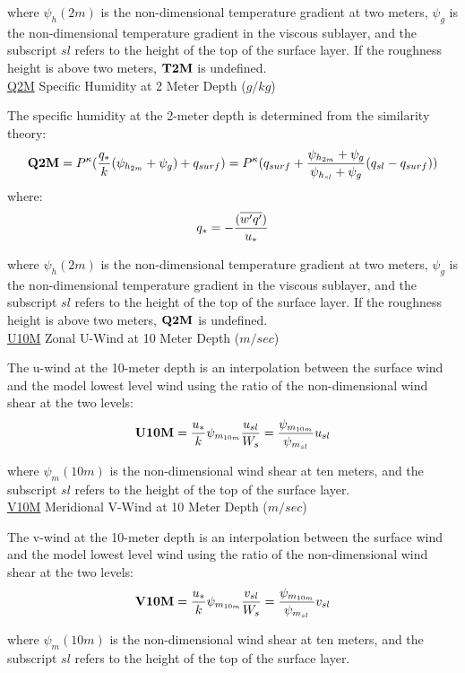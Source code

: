 \noindent
where $\psi_h(2m)$ is the non-dimensional temperature gradient at two meters, $\psi_g$ is
the non-dimensional temperature gradient in the viscous sublayer, and the subscript
$sl$ refers to the height of the top of the surface layer. If the roughness height
is above two meters, ${\bf T2M}$ is undefined.
\\
 
\noindent
{ \underline {Q2M}  Specific Humidity at 2 Meter Depth ($g/kg$) }

\noindent
The specific humidity at the 2-meter depth is determined from the similarity theory:
\[
{\bf Q2M} = P^{\kappa} ({q_* \over k} ({\psi_{h_{2m}}+\psi_g}) + q_{surf} ) = 
P^{\kappa}(q_{surf} + { {\psi_{h_{2m}}+\psi_g} \over {{\psi_{h_{sl}}+\psi_g}} }
(q_{sl} - q_{surf})) 
\]
where:
\[
q_* = - { (\overline{w^{\prime}q^{\prime}}) \over {u_*} }
\]

\noindent
where $\psi_h(2m)$ is the non-dimensional temperature gradient at two meters, $\psi_g$ is
the non-dimensional temperature gradient in the viscous sublayer, and the subscript
$sl$ refers to the height of the top of the surface layer. If the roughness height
is above two meters, ${\bf Q2M}$ is undefined.
\\
 
\noindent
{ \underline {U10M}  Zonal U-Wind at 10 Meter Depth ($m/sec$) }

\noindent
The u-wind at the 10-meter depth is an interpolation between the surface wind
and the model lowest level wind using the ratio of the non-dimensional wind shear
at the two levels:
\[
{\bf U10M} = {u_* \over k} \psi_{m_{10m}} {u_{sl} \over {W_s}} =
{ \psi_{m_{10m}} \over {\psi_{m_{sl}} }}u_{sl}
\]

\noindent
where $\psi_m(10m)$ is the non-dimensional wind shear at ten meters, and the subscript
$sl$ refers to the height of the top of the surface layer.
\\
 
\noindent
{ \underline {V10M}  Meridional V-Wind at 10 Meter Depth ($m/sec$) }

\noindent
The v-wind at the 10-meter depth is an interpolation between the surface wind
and the model lowest level wind using the ratio of the non-dimensional wind shear
at the two levels:
\[
{\bf V10M} = {u_* \over k} \psi_{m_{10m}} {v_{sl} \over {W_s}} =
{ \psi_{m_{10m}} \over {\psi_{m_{sl}} }}v_{sl}
\]

\noindent
where $\psi_m(10m)$ is the non-dimensional wind shear at ten meters, and the subscript
$sl$ refers to the height of the top of the surface layer.
\\
 
